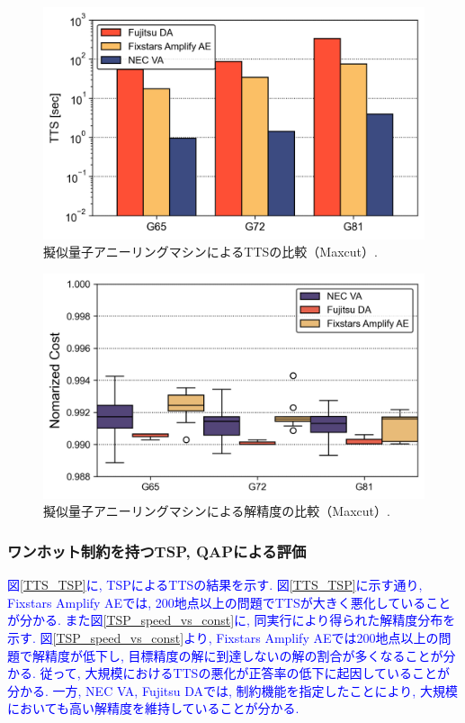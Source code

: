 \documentclass[submit,techrep,noauthor]{ipsj}
\begin{document}
\begin{figure}[ht]
\centering
\includegraphics[bb=0 0 700 230, width=15cm]{TTS_Maxcut.png}
\caption{擬似量子アニーリングマシンによるTTSの比較（Maxcut）.}
\label{Maxcut_TTS}
\end{figure}

\begin{figure}[ht]
\centering
\includegraphics[bb=0 0 700 230, width=15cm]{speed_vs_constraint_Maxcut.png}
\caption{擬似量子アニーリングマシンによる解精度の比較（Maxcut）.}
\label{Maxcut_speed_vs_const}
\end{figure}

\subsubsection{ワンホット制約を持つTSP, QAPによる評価}
\textcolor{blue}{図\ref{TTS_TSP}に, TSPによるTTSの結果を示す. 図\ref{TTS_TSP}に示す通り, Fixstars Amplify AEでは, 200地点以上の問題でTTSが大きく悪化していることが分かる. また図\ref{TSP_speed_vs_const}に, 同実行により得られた解精度分布を示す. 図\ref{TSP_speed_vs_const}より, Fixstars Amplify AEでは200地点以上の問題で解精度が低下し, 目標精度の解に到達しないの解の割合が多くなることが分かる. 従って, 大規模におけるTTSの悪化が正答率の低下に起因していることが分かる. 一方, NEC VA, Fujitsu DAでは, 制約機能を指定したことにより, 大規模においても高い解精度を維持していることが分かる.}
\end{document}
